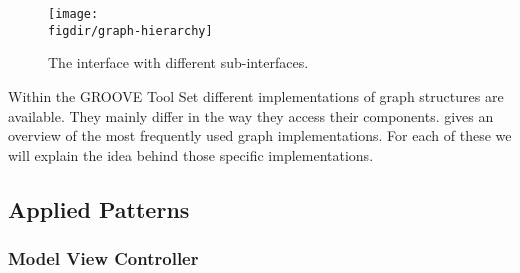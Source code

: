 \begin{figure}
  \centering
  \texttt{[image: \\figdir/graph-hierarchy]}
  \caption{The \Graph interface with different sub-interfaces.}
\end{figure}

Within the GROOVE Tool Set different implementations of graph structures are available. They mainly differ in the way they access their components.  gives an overview of the most frequently used graph implementations. For each of these we will explain the idea behind those specific implementations.

\subsection{Applied Patterns}

\subsubsection{Model View Controller}